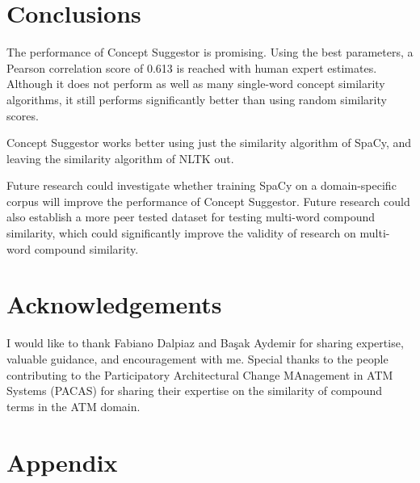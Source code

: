 \documentclass{article}
\begin{document}
\section{Conclusions} \label{sec:conclusions}

The performance of Concept Suggestor is promising. Using the best parameters, a Pearson correlation score of 0.613 is reached with human expert estimates. Although it does not perform as well as many single-word concept similarity algorithms, it still performs significantly better than using random similarity scores. 

Concept Suggestor works better using just the similarity algorithm of SpaCy, and leaving the similarity algorithm of NLTK out.

Future research could investigate whether training SpaCy on a domain-specific corpus will improve the performance of Concept Suggestor. Future research could also establish a more peer tested dataset for testing multi-word compound similarity, which could significantly improve the validity of research on multi-word compound similarity.

\section{Acknowledgements} \label{sec:ack}

I would like to thank Fabiano Dalpiaz and Ba\c sak Aydemir for sharing expertise, valuable guidance, and encouragement with me. Special thanks to the people contributing to the Participatory Architectural Change MAnagement in ATM Systems (PACAS) for sharing their expertise on the similarity of compound terms in the ATM domain.

\printbibliography

\section{Appendix}
\end{document}

